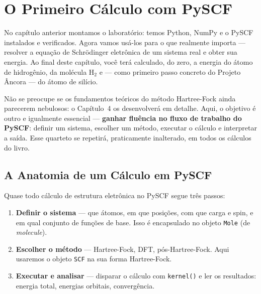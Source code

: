 \documentclass[11pt,a4paper,openany]{book}
\newcommand{\code}[1]{\texttt{#1}}
\newcommand{\pyscf}{\textsf{PySCF}}
\newcommand{\numpy}{\textsf{NumPy}}
\newcommand{\python}{\textsf{Python}}
\begin{document}
\chapter{O Primeiro Cálculo com PySCF}
\label{cap:primeiro}

No capítulo anterior montamos o laboratório: temos \python{}, \numpy{} e o
\pyscf{} instalados e verificados. Agora vamos usá-los para o que realmente
importa --- resolver a equação de Schrödinger eletrônica de um sistema real e
obter sua energia. Ao final deste capítulo, você terá calculado, do zero, a
energia do átomo de hidrogênio, da molécula H$_2$ e --- como primeiro passo
concreto do Projeto Âncora --- do átomo de silício.

Não se preocupe se os fundamentos teóricos do método Hartree-Fock ainda
parecerem nebulosos: o Capítulo~4 os desenvolverá em detalhe. Aqui, o objetivo é
outro e igualmente essencial --- \textbf{ganhar fluência no fluxo de trabalho do
\pyscf{}}: definir um sistema, escolher um método, executar o cálculo e
interpretar a saída. Esse quarteto se repetirá, praticamente inalterado, em todos
os cálculos do livro.

\section{A Anatomia de um Cálculo em PySCF}
\label{sec:anatomia}

Quase todo cálculo de estrutura eletrônica no \pyscf{} segue três passos:

\begin{enumerate}[leftmargin=*]
  \item \textbf{Definir o sistema} --- que átomos, em que posições, com que carga
        e spin, e em qual conjunto de funções de base. Isso é encapsulado no
        objeto \code{Mole} (de \emph{molecule}).
  \item \textbf{Escolher o método} --- Hartree-Fock, DFT, pós-Hartree-Fock. Aqui
        usaremos o objeto \code{SCF} na sua forma Hartree-Fock.
  \item \textbf{Executar e analisar} --- disparar o cálculo com \code{kernel()} e
        ler os resultados: energia total, energias orbitais, convergência.
\end{enumerate}
\end{document}
